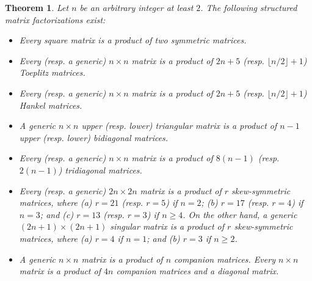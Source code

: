 \documentclass[reqno]{amsart}
\newtheorem{theorem}{Theorem}[section]
\theoremstyle{definition}
\numberwithin{equation}{section}
\begin{document}
\begin{theorem}\label{thm:previous results}
    Let $n$ be an arbitrary integer at least $2$. The following structured matrix factorizations exist:
    \begin{itemize}
        \item [(\romannumeral 1)] Every square matrix is a product of two symmetric matrices.
        \item [(\romannumeral 2)] Every (resp. a generic) $n \times n$ matrix is a product of $2n+5$ (resp. $\lfloor n/2 \rfloor+1$) Toeplitz matrices.
        \item [(\romannumeral 3)] Every (resp. a generic) $n \times n$ matrix is a product of $2n+5$ (resp. $\lfloor n/2 \rfloor+1$) Hankel matrices.
        \item [(\romannumeral 4)] A generic $n \times n$ upper (resp. lower) triangular matrix is a product of $n-1$ upper (resp. lower)  bidiagonal matrices.
        \item [(\romannumeral 5)] Every (resp. a generic) $n \times n$ matrix is a product of $8(n-1)$ (resp. $2(n-1)$) tridiagonal matrices.
        \item [(\romannumeral 6)] Every (resp. a generic) $2n \times 2n$ matrix is a product of $r$ skew-symmetric matrices, where (a) $r=21$ (resp. $r= 5$) if $n=2$; (b) $r=17$ (resp. $r=4$) if $n=3$; and (c) $r=13$ (resp. $r=3$) if $n \geq 4$.  On the other hand, a generic  $(2n+1) \times (2n+1)$ singular matrix is a product of $r$ skew-symmetric matrices, where (a) $r=4$ if $n=1$; and (b) $r=3$ if $n \geq 2$.
        \item [(\romannumeral 7)] A generic $n \times n$ matrix is a product of $n$ companion matrices. Every $n \times n$ matrix is a product of $4n$ companion matrices and a diagonal matrix.
    \end{itemize}


\end{theorem}
\end{document}
